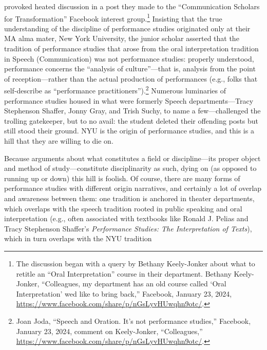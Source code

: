 \documentclass{tufte-handout}
\begin{document}
\begin{titlepage}
\vspace{0.2in}

 provoked heated discussion in a post they
made to the ``Communication Scholars for Transformation'' Facebook
interest group.\footnote{The discussion began with a query by Bethany
  Keely-Jonker about what to retitle an ``Oral Interpretation'' course
  in their department. Bethany Keely-Jonker, ``Colleagues, my department
  has an old course called `Oral Interpretation' we\textquotesingle d
  like to bring back,'' Facebook, January 23, 2024,
  \url{https://www.facebook.com/share/p/nGsLyvHUwqhn9otc/}.} Insisting that
the true understanding of the discipline of performance studies
originated only at their MA alma mater, New York University, the junior
scholar asserted that the tradition of performance studies that arose
from the oral interpretation tradition in Speech (Communication) was not
performance studies: properly understood, performance concerns the
``analysis of culture''---that is, analysis from the point of
reception---rather than the actual production of performances (e.g.,
folks that self-describe as ``performance practitioners'').\footnote{Joan
  Joda, ``Speech and Oration. It's not performance studies,'' Facebook,
  January 23, 2024, comment on Keely-Jonker, ``Colleagues,''
  \url{https://www.facebook.com/share/p/nGsLyvHUwqhn9otc/}.} Numerous
luminaries of performance studies housed in what were formerly Speech
departments---Tracy Stephenson Shaffer, Jonny Gray, and Trish Suchy, to
name a few---challenged the trolling gatekeeper, but to no avail: the
student deleted their offending posts but still stood their ground. NYU
is the origin of performance studies, and this is a hill that they are
willing to die on.

Because arguments about what constitutes a field or discipline---its
proper object and method of study---constitute disciplinarity as such,
dying on (as opposed to running up or down) this hill is foolish. Of
course, there are many forms of performance studies with different
origin narratives, and certainly a lot of overlap and awareness between
them: one tradition is anchored in theater departments, which overlaps
with the speech tradition rooted in public speaking and oral
interpretation (e.g., often associated with textbooks like Ronald J.
Pelias and Tracy Stephenson Shaffer's \emph{Performance Studies: The
Interpretation of Texts}), which in turn overlaps with the NYU tradition


\enlargethispage{2\baselineskip}

\vspace*{2em}



 \end{titlepage}
\end{document}
